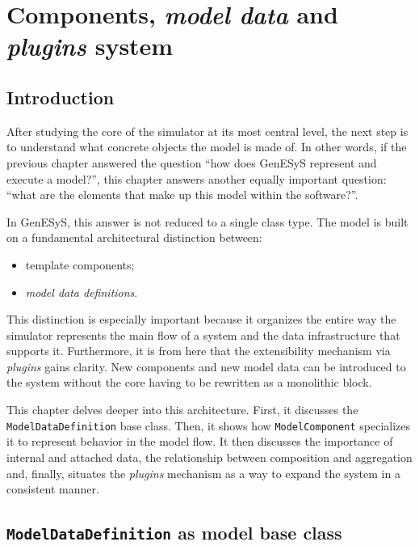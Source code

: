 \chapter{Components, \textit{model data} and \textit{plugins} system}
\label{chap:componentes_model_data_plugins}

\section{Introduction}
\label{sec:cap8_introducao}

After studying the core of the simulator at its most central level, the next step is to understand what concrete objects the model is made of. In other words, if the previous chapter answered the question ``how does GenESyS represent and execute a model?'', this chapter answers another equally important question: ``what are the elements that make up this model within the software?''.

In GenESyS, this answer is not reduced to a single class type. The model is built on a fundamental architectural distinction between:
\begin{itemize}
 \item template components;
 \item \textit{model data definitions}.
\end{itemize}

This distinction is especially important because it organizes the entire way the simulator represents the main flow of a system and the data infrastructure that supports it. Furthermore, it is from here that the extensibility mechanism via \textit{plugins} gains clarity. New components and new model data can be introduced to the system without the core having to be rewritten as a monolithic block.

This chapter delves deeper into this architecture. First, it discusses the \texttt{ModelDataDefinition} base class. Then, it shows how \texttt{ModelComponent} specializes it to represent behavior in the model flow. It then discusses the importance of internal and attached data, the relationship between composition and aggregation and, finally, situates the \textit{plugins} mechanism as a way to expand the system in a consistent manner.

\section{\texttt{ModelDataDefinition} as model base class}
\label{sec:cap8_modeldatadefinition}

